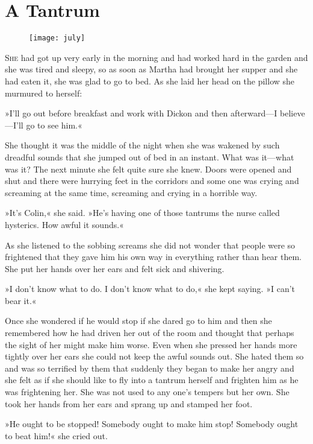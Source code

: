 \chapter{A Tantrum} 
	
\begin{figure}[t!]
\centering
\texttt{[image: july]}
\end{figure}

 \lettrine[lines=6]{S}{he} had got up very early in the morning and had worked hard in the garden and she was tired and sleepy, so as soon as Martha had brought her supper and she had eaten it, she was glad to go to bed. As she laid her head on the pillow she murmured to herself:

\zz
»I'll go out before breakfast and work with Dickon and then afterward—I believe—I'll go to see him.«

She thought it was the middle of the night when she was wakened by such dreadful sounds that she jumped out of bed in an instant. What was it—what was it? The next minute she felt quite sure she knew. Doors were opened and shut and there were hurrying feet in the corridors and some one was crying and screaming at the same time, screaming and crying in a horrible way.

»It's Colin,« she said. »He's having one of those tantrums the nurse called hysterics. How awful it sounds.«

As she listened to the sobbing screams she did not wonder that people were so frightened that they gave him his own way in everything rather than hear them. She put her hands over her ears and felt sick and shivering.

»I don't know what to do. I don't know what to do,« she kept saying. »I can't bear it.«

Once she wondered if he would stop if she dared go to him and then she remembered how he had driven her out of the room and thought that perhaps the sight of her might make him worse. Even when she pressed her hands more tightly over her ears she could not keep the awful sounds out. She hated them so and was so terrified by them that suddenly they began to make her angry and she felt as if she should like to fly into a tantrum herself and frighten him as he was frightening her. She was not used to any one's tempers but her own. She took her hands from her ears and sprang up and stamped her foot.

»He ought to be stopped! Somebody ought to make him stop! Somebody ought to beat him!« she cried out.

